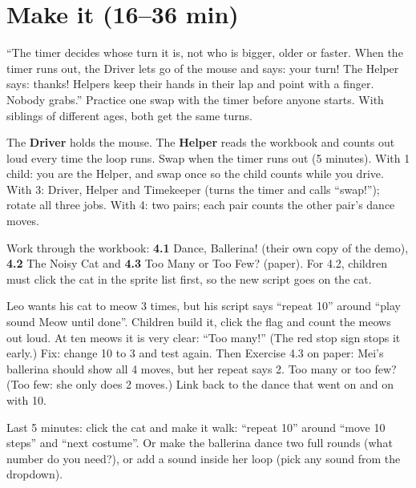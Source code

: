 \section{Make it (16--36 min)}
\begin{safety}
\enquote{The timer decides whose turn it is, not who is bigger, older or faster. When the timer runs out, the Driver lets go of the mouse and says: your turn! The Helper says: thanks! Helpers keep their hands in their lap and point with a finger. Nobody grabs.} Practice one swap with the timer before anyone starts. With siblings of different ages, both get the same turns.
\end{safety}

\begin{pairroles}
The \textbf{Driver} holds the mouse. The \textbf{Helper} reads the workbook and counts out loud every time the loop runs. Swap when the timer runs out (5 minutes). With 1 child: you are the Helper, and swap once so the child counts while you drive. With 3: Driver, Helper and Timekeeper (turns the timer and calls \enquote{swap!}); rotate all three jobs. With 4: two pairs; each pair counts the other pair's dance moves.
\end{pairroles}

Work through the workbook: \textbf{4.1} Dance, Ballerina! (their own copy of the demo), \textbf{4.2} The Noisy Cat and \textbf{4.3} Too Many or Too Few? (paper). For 4.2, children must click the cat in the sprite list first, so the new script goes on the cat.

\begin{bughunt}
Leo wants his cat to meow 3 times, but his script says \enquote{repeat 10} around \enquote{play sound Meow until done}. Children build it, click the flag and count the meows out loud. At ten meows it is very clear: \enquote{Too many!} (The red stop sign stops it early.) Fix: change 10 to 3 and test again. Then Exercise 4.3 on paper: Mei's ballerina should show all 4 moves, but her repeat says 2. Too many or too few? (Too few: she only does 2 moves.) Link back to the dance that went on and on with 10.
\end{bughunt}

\begin{freebuild}
Last 5 minutes: click the cat and make it walk: \enquote{repeat 10} around \enquote{move 10 steps} and \enquote{next costume}. Or make the ballerina dance two full rounds (what number do you need?), or add a sound inside her loop (pick any sound from the dropdown).
\end{freebuild}

